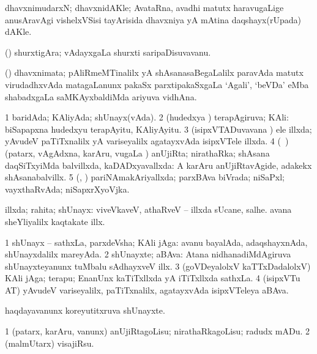 {{{{{{{{{{{{\bentry 
{} 
\gl{\nA}
\expl{}
\bmng
 dhavxnimudarxN; dhavxnidAKle; AvataRna, avadhi matutx haravugaLige anusAravAgi vishelxVSisi tayArisida dhavxniya yA mAtina daqshayx(rUpada) dAKle. 
\emng
\eentry

\bentry
{} 
\gl{\nA}
\expl{}
\bmng
 (\saM) shurxtigAra; vAdayxgaLa shurxti saripaDisuvavanu. 
\emng
\eentry

\bentry
{}
\gl{\nA}
\bmng
(\ame) dhavxnimata; pAliRmeMTinalilx yA shAsanasaBegaLalilx paravAda matutx virudadhxvAda matagaLanunx pakaSx parxtipakaSxgaLa `Agali', `beVDa' eMba shabadxgaLa saMKAyxbaldiMda ariyuva vidhAna. 
\emng
\eentry

\bentry 
{} 
\gl{\gu}
\expl{}
\bmng
\bnum
\num{1} baridAda; KAliyAda; shUnayx(vAda). 
\num{2} (hudedxya \vi) terapAgiruva; KAli:  biSapapxna hudedxyu terapAyitu, KAliyAyitu. 
\num{3} (isipxVTADuvavana \vi) ele illxda; yAvudeV paTiTxnalilx yA variseyalilx agatayxvAda isipxVTele illxda. 
\num{4} (\kanmu\ \nAyxshA)(patarx, vAgAdxna, karAru, \mo vugaLa \vi) anUjiRta; nirathaRka; shAsana daqSiTxyiMda balvillxda, kaDADxyavallxda:  A karAru anUjiRtavAgide, adakekx shAsanabalvillx. 
\num{5} (\kAparx, \alaMshA) pariNAmakAriyallxda; parxBAva biVrada; niSaPxl; vayxthaRvAda; niSapxrXyoVjka. 
\enum
\emng

\noindent 
\gl{\pagu}
\expl{}
\bmng
  illxda; rahita; shUnayx:  viveVkaveV, athaRveV -- illxda sUcane, salhe.  avana sheYliyalilx kaqtakate illx. 
\emng
\eentry

\bentry 
{} 
\gl{\nA}
\expl{}
\bmng
\bnum
\num{1} shUnayx -- sathxLa, parxdeVsha; KAli jAga:  avanu bayalAda, adaqshayxnAda, shUnayxdalilx mareyAda. 
\num{2} shUnayxte; aBAva:  Atana nidhanadiMdAgiruva shUnayxteyanunx tuMbalu sAdhayxveV illx. 
\num{3} (goVDeyalolxV kaTTxDadalolxV) KAli jAga; terapu; EnanUnx kaTiTxllxda yA iTiTxllxda sathxLa. 
\num{4} (isipxVTu AT) yAvudeV variseyalilx, paTiTxnalilx, agatayxvAda isipxVTeleya aBAva. 
\enum
\emng

\noindent 
\gl{\pagu}
\expl{}
\bmng
  haqdayavanunx koreyutitxruva shUnayxte. 
\emng
\eentry

\bentry
{} 
\gl{\sakirx}
\expl{}
\bmng
\bnum
\num{1} (patarx, karAru, \mo vanunx) anUjiRtagoLisu; nirathaRkagoLisu; radudx mADu. 
\num{2} (malmUtarx) visajiRsu. 
\enum
\emng

}}}}}}}}}}}}

